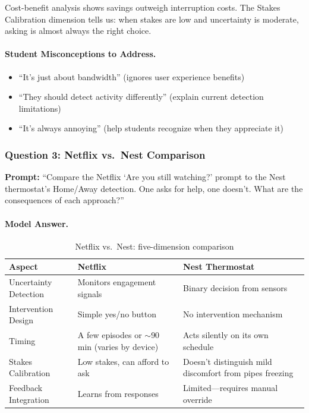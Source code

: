 \begin{keyconcept}
Cost-benefit analysis shows savings outweigh interruption costs. The Stakes Calibration dimension tells us: when stakes are low and uncertainty is moderate, asking is almost always the right choice.
\end{keyconcept}

\paragraph{Student Misconceptions to Address.}
\begin{itemize}
    \item ``It's just about bandwidth'' (ignores user experience benefits)
    \item ``They should detect activity differently'' (explain current detection limitations)
    \item ``It's always annoying'' (help students recognize when they appreciate it)
\end{itemize}

\subsubsection{Question 3: Netflix vs.\ Nest Comparison}

\textbf{Prompt:} ``Compare the Netflix `Are you still watching?' prompt to the Nest thermostat's Home/Away detection. One asks for help, one doesn't. What are the consequences of each approach?''

\paragraph{Model Answer.}

\begin{table}[htbp]
\caption{Netflix vs.\ Nest: five-dimension comparison}
\label{tab:netflix-nest-five-dim}
\centering
\begin{tabular}{@{}p{3.5cm}p{4.5cm}p{4.5cm}@{}}
\toprule
\textbf{Aspect} & \textbf{Netflix} & \textbf{Nest Thermostat} \\
\midrule
Uncertainty Detection & Monitors engagement signals & Binary decision from sensors \\
Intervention Design & Simple yes/no button & No intervention mechanism \\
Timing & A few episodes or $\sim$90 min (varies by device) & Acts silently on its own schedule \\
Stakes Calibration & Low stakes, can afford to ask & Doesn't distinguish mild discomfort from pipes freezing \\
Feedback Integration & Learns from responses & Limited---requires manual override \\
\bottomrule
\end{tabular}
\end{table}

